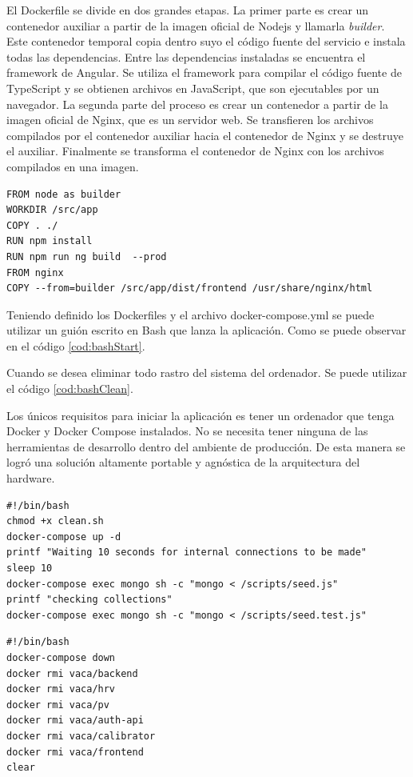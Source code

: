 El Dockerfile se divide en dos grandes etapas.
La primer parte es crear un contenedor auxiliar a partir de la imagen oficial de Nodejs y llamarla \emph{builder}.
Este contenedor temporal copia dentro suyo el código fuente del servicio e instala todas las dependencias.
Entre las dependencias instaladas se encuentra el framework de Angular.
Se utiliza el framework para compilar el código fuente de TypeScript y se obtienen archivos en JavaScript, que son ejecutables por un navegador.
La segunda parte del proceso es crear un contenedor a partir de la imagen oficial de Nginx, que es un servidor web.
Se transfieren los archivos compilados por el contenedor auxiliar hacia el contenedor de Nginx y se destruye el auxiliar.
Finalmente se transforma el contenedor de Nginx con los archivos compilados en una imagen.

\begin{lstlisting}[label=cod:dfFrontend,caption=Dockerfile del servicio Frontend.]
FROM node as builder
WORKDIR /src/app
COPY . ./
RUN npm install
RUN npm run ng build  --prod
FROM nginx
COPY --from=builder /src/app/dist/frontend /usr/share/nginx/html
\end{lstlisting}

Teniendo definido los Dockerfiles y el archivo docker-compose.yml se puede utilizar un guión escrito en Bash que lanza la aplicación.
Como se puede observar en el código \ref{cod:bashStart}.

Cuando se desea eliminar todo rastro del sistema del ordenador.
Se puede utilizar el código \ref{cod:bashClean}.

Los únicos requisitos para iniciar la aplicación es tener un ordenador que tenga Docker y Docker Compose instalados.
No se necesita tener ninguna de las herramientas de desarrollo dentro del ambiente de producción.
De esta manera se logró una solución altamente portable y agnóstica de la arquitectura del hardware.

\begin{lstlisting}[label=cod:bashStart,caption=Guión de inicialización.]
#!/bin/bash
chmod +x clean.sh
docker-compose up -d
printf "Waiting 10 seconds for internal connections to be made"
sleep 10
docker-compose exec mongo sh -c "mongo < /scripts/seed.js"
printf "checking collections"
docker-compose exec mongo sh -c "mongo < /scripts/seed.test.js"
\end{lstlisting}

\begin{lstlisting}[label=cod:bashClean,caption=Guión de limpieza.]
#!/bin/bash
docker-compose down
docker rmi vaca/backend
docker rmi vaca/hrv
docker rmi vaca/pv
docker rmi vaca/auth-api
docker rmi vaca/calibrator
docker rmi vaca/frontend
clear
\end{lstlisting}

